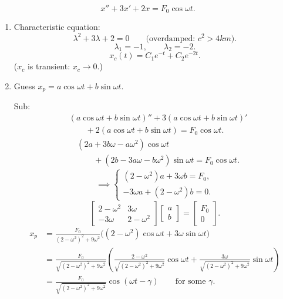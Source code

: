 \begin{example}
  \[
    x''+3x'+2x=F_0\cos\omega t.
  \]
  \begin{enumerate}
    \item Characteristic equation:
          \[
            \lambda^2+3\lambda+2=0
            \qquad\text{(overdamped: $c^2>4km$).}
          \]
          \[
            \lambda_1=-1,\qquad\lambda_2=-2.
          \]
          \[
            x_c(t)=C_1e^{-t}+C_2e^{-2t}.
          \]
          ($x_c$ is transient: $x_c\to0$.)
    \item Guess $x_p=a\cos\omega t+b\sin\omega t$.

          Sub:
          \begin{align*}
             & (a\cos\omega t+b\sin\omega t)''
            +3(a\cos\omega t+b\sin\omega t)'                          \\
             & \qquad+2(a\cos\omega t+b\sin\omega t)=F_0\cos\omega t.
          \end{align*}
          \begin{align*}
             & (2a+3b\omega-a\omega^2)\cos\omega t                         \\
             & \qquad+(2b-3a\omega-b\omega^2)\sin\omega t=F_0\cos\omega t.
          \end{align*}
          \[
            \implies
            \begin{cases}
              (2-\omega^2)a+3\omega b=F_0, \\
              -3\omega a+(2-\omega^2)b=0.
            \end{cases}
          \]
          \[
            \begin{bmatrix}
              2-\omega^2 & 3\omega    \\
              -3\omega   & 2-\omega^2
            \end{bmatrix}
            \begin{bmatrix}
              a \\b
            \end{bmatrix}
            =
            \begin{bmatrix}
              F_0 \\0
            \end{bmatrix}
            .
          \]
          \begin{align*}
            x_p
             & =\frac{F_0}{(2-\omega^2)^2+9\omega^2}
            \bigl((2-\omega^2)\cos\omega t+3\omega\sin\omega t\bigr) \\
             & =\frac{F_0}{\sqrt{(2-\omega^2)^2+9\omega^2}}
            \left(
            \frac{2-\omega^2}{\sqrt{(2-\omega^2)^2+9\omega^2}}\cos\omega t
            +\frac{3\omega}{\sqrt{(2-\omega^2)^2+9\omega^2}}\sin\omega t
            \right)                                                  \\
             & =\frac{F_0}{\sqrt{(2-\omega^2)^2+9\omega^2}}
            \cos(\omega t-\gamma)\qquad\text{for some $\gamma$.}
          \end{align*}
  \end{enumerate}
\end{example}
